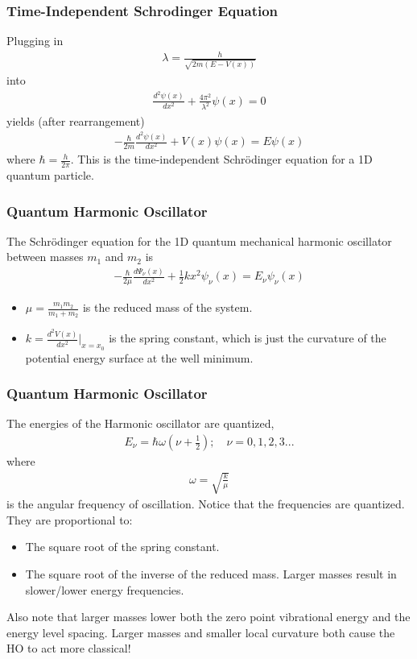 \documentclass{beamer}
\newenvironment{noheadline}{
	\setbeamertemplate{headline}{}
	\addtobeamertemplate{frametitle}{\vspace*{-0.9\baselineskip}}{}
}{}
\begin{document}
\begin{noheadline}
\begin{frame}
\frametitle{Time-Independent Schrodinger Equation}
Plugging in 
\begin{align*}
\lambda = \frac{h}{\sqrt{2m (E - V(x))}}
\end{align*}
into
\begin{align*}
\frac{d^2 \psi(x)}{d x^2} + \frac{4 \pi^2}{\lambda^2}\psi(x) = 0
\end{align*}
yields (after rearrangement)
\begin{align*}
-\frac{\hbar}{2m} \frac{d^2 \psi(x)}{dx^2} + V(x) \psi(x) = E\psi(x)
\end{align*}
where $\hbar = \frac{h}{2\pi}$. This is the time-independent Schr\"{o}dinger equation for a 1D quantum particle.
\end{frame}

\begin{frame}
\frametitle{Quantum Harmonic Oscillator}
The Schr\"{o}dinger equation for the 1D quantum mechanical harmonic oscillator between masses $m_{1}$ and $m_{2}$ is
\begin{align*}
-\frac{\hbar}{2\mu} \frac{d\Psi_{\nu}(x)}{dx^2} + \frac{1}{2} k x^{2} \psi_{\nu}(x) = E_{\nu} \psi_{\nu}(x)
\end{align*}
\begin{itemize}
	\item $\mu = \frac{m_{1}m_{2}}{m_{1} + m_{2}}$ is the reduced mass of the system.
	\item $k = \frac{d^{2} V(x)}{dx^2} \big|_{x=x_{0}}$ is the spring constant, which is just the curvature of the potential energy surface at the well minimum.
\end{itemize}
\end{frame}

\begin{frame}
\frametitle{Quantum Harmonic Oscillator}
The energies of the Harmonic oscillator are quantized,
\begin{align*}
E_{\nu} = \hbar \omega (\nu + \frac{1}{2}); \quad \nu = 0, 1, 2, 3... 
\end{align*}
where
\begin{align*}
\omega = \sqrt{\frac{k}{\mu}}
\end{align*}
is the angular frequency of oscillation. Notice that the frequencies are quantized. They are proportional to:
\begin{itemize}
	\item The square root of the spring constant.
	\item The square root of the inverse of the reduced mass. Larger masses result in slower/lower energy frequencies.
\end{itemize}
Also note that larger masses lower both the zero point vibrational energy and the energy level spacing. Larger masses and smaller local curvature both cause the HO to act more classical!
\end{frame}


\end{noheadline}
\end{document}
